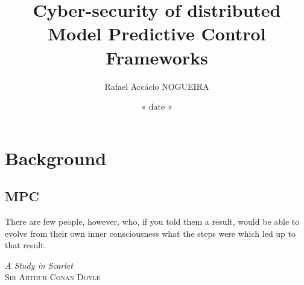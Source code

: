 \documentclass{these-dbl}
\author{Rafael Accácio NOGUEIRA}
\title{Cyber-security of distributed Model Predictive Control Frameworks}
\date{« date »}
\begin{document}
\maketitle

% 



% 


% 

\cleartooddpage[\thispagestyle{empty}]
\printglossary[type=\acronymtype,title=List of Acronyms]

\cleartooddpage[\thispagestyle{empty}]
\listoffigures
{}
\cleartooddpage[\thispagestyle{empty}]
\listoftables

\cleartooddpage[\thispagestyle{empty}]
\printglossary

% 


% 

\part{Background}
\chapter{MPC}
\epigraph{\centering There are few people, however, who, if you told them a result, would be able to evolve from their own inner consciousness what the steps were which led up to that result.}
{\textit{A Study in Scarlet}\\ \textsc{Sir Arthur Conan Doyle}}
\end{document}
